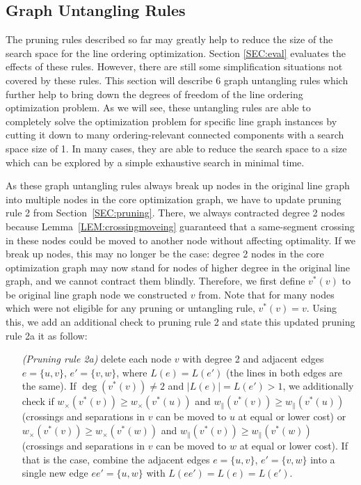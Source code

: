 \documentclass[format=acmsmall, review=false, screen=true]{acmart}
\begin{document}
\subsection{Graph Untangling Rules}\label{SEC:untangling}

The pruning rules described so far may greatly help to reduce the size of the search space for the line ordering optimization.
Section \ref{SEC:eval} evaluates the effects of these rules.
However, there are still some simplification situations not covered by these rules.
This section will describe 6 graph untangling rules which further help to bring down the degrees of freedom of the line ordering optimization problem.
As we will see, these untangling rules are able to completely solve the optimization problem for specific line graph instances by cutting it down to many ordering-relevant connected components with a search space size of 1.
In many cases, they are able to reduce the search space to a size which can be explored by a simple exhaustive search in minimal time.

As these graph untangling rules always break up nodes in the original line graph into multiple nodes in the core optimization graph, we have to update pruning rule 2 from Section~\ref{SEC:pruning}.
There, we always contracted degree 2 nodes because Lemma~\ref{LEM:crossingmoveing} guaranteed that a same-segment crossing in these nodes could be moved to another node without affecting optimality.
If we break up nodes, this may no longer be the case: degree 2 nodes in the core optimization graph may now stand for nodes of higher degree in the original line graph, and we cannot contract them blindly.
Therefore, we first define $v^*(v)$ to be original line graph node we constructed $v$ from.
Note that for many nodes which were not eligible for any pruning or untangling rule, $v^*(v) = v$.
Using this, we add an additional check to pruning rule 2 and state this updated pruning rule 2a it as follow:
\begin{enumerate}[parsep=0.5mm, wide, labelwidth=0mm, itemindent=2.3mm]
  \setlength\itemsep{1pt}
  \item[\emph{(Pruning rule 2a)}] delete each node $v$ with degree 2 and adjacent edges $e = \{u, v\}$, $e' = \{v, w\}$,
  where 
  $L(e) = L(e')$ (the lines in both edges are the same). If $\deg(v^*(v)) \neq 2$ and $|L(e)| = L(e') > 1$, we additionally check if
  $w_\times(v^*(v)) \geq w_\times(v^*(u))$ and $w_\|(v^*(v)) \geq w_\|(v^*(u))$ (crossings and separations in $v$ can be moved to $u$ at equal or lower cost) 
  or
  $w_\times(v^*(v)) \geq w_\times(v^*(w))$ and $w_\|(v^*(v)) \geq w_\|(v^*(w))$ (crossings and separations in $v$ can be moved to $w$ at equal or lower cost). If that is the case, combine the adjacent edges $e = \{u, v\}$, $e' = \{v, w\}$ into a single new edge $ee' = \{u, w\}$ with $L(ee') = L(e) = L(e')$.
\end{enumerate}
\end{document}
